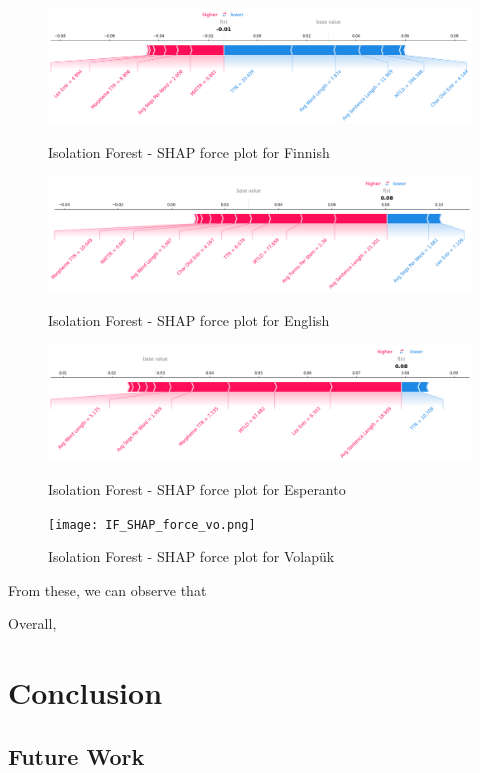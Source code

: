 \documentclass[12pt,a4paper]{article}
\numberwithin{figure}{section}
\numberwithin{table}{section}
\numberwithin{definition}{section}
\begin{document}
\begin{figure}[!ht]
  \centering
  \includegraphics[width=\textwidth]{IF_SHAP_force_fi.png} 
  \caption{Isolation Forest - SHAP force plot for Finnish}
  \includegraphics[width=\textwidth]{IF_SHAP_force_en.png}
  \caption{Isolation Forest - SHAP force plot for English}
  \includegraphics[width=\textwidth]{IF_SHAP_force_eo.png}
  \caption{Isolation Forest - SHAP force plot for Esperanto}
  \texttt{[image: IF\_SHAP\_force\_vo.png]}
  \caption{Isolation Forest - SHAP force plot for Volapük}
  \label{fig:shapforceplots}
\end{figure}

From these, we can observe that 

Overall,

\clearpage
\newpage
\section{Conclusion}
\label{sec:conclusion}



\subsection{Future Work}
\label{ssec:futurework}
\end{document}
